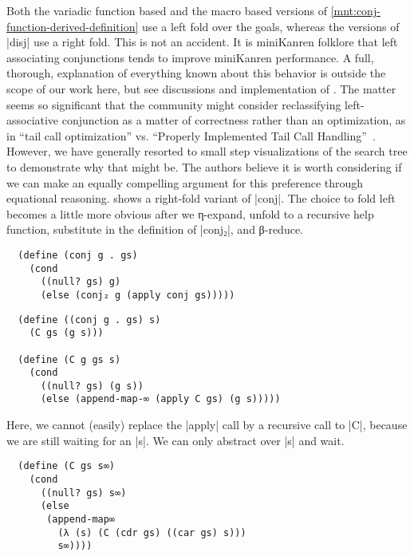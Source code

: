 \documentclass[sigplan,screen,draft,anonymous,review,natbib=false]{acmart}
\begin{document}
Both the variadic function based and the macro based versions of
\cref{mnt:conj-function-derived-definition} use a left fold over the
goals, whereas the versions of \rackinline|disj| use a right fold.
This is not an accident. It is miniKanren folklore that left
associating conjunctions tends to improve miniKanren performance. A
full, thorough, explanation of everything known about this behavior is
outside the scope of our work here, but see discussions and
implementation of \cite{rosenblatt2019first}. The matter seems so
significant that the community might consider reclassifying
left-associative conjunction as a matter of correctness rather than an
optimization, as in \enquote{tail call optimization} vs.
\enquote{Properly Implemented Tail Call
  Handling}~\cite{felleisen2014requestions}. However, we have
generally resorted to small step visualizations of the search tree to
demonstrate why that might be. The authors believe it is worth
considering if we can make an equally compelling argument for this
preference through equational reasoning.
 shows a right-fold variant of
\rackinline|conj|. The choice to fold left becomes a little more
obvious after we η-expand, unfold to a recursive help function,
substitute in the definition of \rackinline|conj₂|, and β-reduce.

\begin{listing}[h]
\begin{verbatim}
  (define (conj g . gs)
    (cond
      ((null? gs) g)
      (else (conj₂ g (apply conj gs)))))
\end{verbatim}
  \caption{A right-fold variant of \rackinline|conj|.}
  \label{mnt:conj-right-fold-definition}
\end{listing}

\begin{verbatim}
  (define ((conj g . gs) s)
    (C gs (g s)))

  (define (C g gs s)
    (cond
      ((null? gs) (g s))
      (else (append-map-∞ (apply C gs) (g s)))))
\end{verbatim}

\noindent Here, we cannot (easily) replace the \rackinline|apply| call
by a recursive call to \rackinline|C|, because we are still waiting
for an \rackinline|s|. We can only abstract over \rackinline|s| and
wait.

\begin{verbatim}
  (define (C gs s∞)
    (cond
      ((null? gs) s∞)
      (else
       (append-map∞
         (λ (s) (C (cdr gs) ((car gs) s)))
         s∞))))
\end{verbatim}
\end{document}

